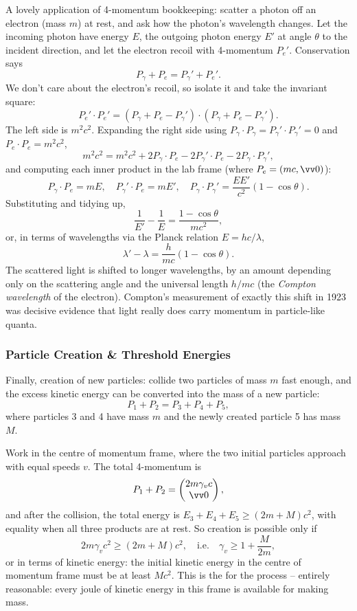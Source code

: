 \begin{example}
	A lovely application of 4-momentum bookkeeping: scatter a photon off an electron (mass $m$) at rest, and ask how the photon's wavelength changes. Let the incoming photon have energy $E$, the outgoing photon energy $E'$ at angle $\theta$ to the incident direction, and let the electron recoil with 4-momentum $P_e'$. Conservation says
	$$
	P_\gamma + P_e = P_\gamma' + P_e'.
	$$
	We don't care about the electron's recoil, so isolate it and take the invariant square:
	$$
	P_e' \cdot P_e' = (P_\gamma + P_e - P_\gamma') \cdot (P_\gamma + P_e - P_\gamma') .
	$$
	The left side is $m^2c^2$. Expanding the right side using $P_\gamma \cdot P_\gamma = P_\gamma' \cdot P_\gamma' = 0$ and $P_e \cdot P_e = m^2c^2$,
	$$
	m^2 c^2 = m^2c^2 + 2 P_\gamma \cdot P_e - 2 P_\gamma' \cdot P_e - 2 P_\gamma \cdot P_\gamma',
	$$
	and computing each inner product in the lab frame (where $P_e = (mc, \vv 0)$):
	$$
	P_\gamma \cdot P_e = mE, \quad P_\gamma' \cdot P_e = mE', \quad P_\gamma \cdot P_\gamma' = \frac{EE'}{c^2}(1 - \cos\theta).
	$$
	Substituting and tidying up,
	$$
	\frac{1}{E'} - \frac{1}{E} = \frac{1 - \cos\theta}{mc^2},
	$$
	or, in terms of wavelengths via the Planck relation $E = hc/\lambda$,
	$$
	\lambda' - \lambda = \frac{h}{mc}(1 - \cos \theta).
	$$
	The scattered light is shifted to longer wavelengths, by an amount depending only on the scattering angle and the universal length $h/mc$ (the \emph{Compton wavelength} of the electron). Compton's measurement of exactly this shift in 1923 was decisive evidence that light really does carry momentum in particle-like quanta.
\end{example}

\subsubsection{Particle Creation \& Threshold Energies}

Finally, creation of new particles: collide two particles of mass $m$ fast enough, and the excess kinetic energy can be converted into the mass of a new particle:
$$
P_1 + P_2 = P_3 + P_4 + P_5,
$$
where particles 3 and 4 have mass $m$ and the newly created particle 5 has mass $M$.

Work in the centre of momentum frame, where the two initial particles approach with equal speeds $v$. The total 4-momentum is
$$
P_1 + P_2 = \begin{pmatrix} 2m \gamma_v c \\ \vv 0\end{pmatrix},
$$
and after the collision, the total energy is $E_3 + E_4 + E_5 \geq (2m + M)c^2$, with equality when all three products are at rest. So creation is possible only if
$$
2m\gamma_v c^2 \geq (2m + M)c^2, \quad \text{i.e.} \quad \gamma_v \geq 1 + \frac{M}{2m},
$$
or in terms of kinetic energy: the initial kinetic energy in the centre of momentum frame must be at least $Mc^2$. This is the  for the process -- entirely reasonable: every joule of kinetic energy in this frame is available for making mass.

